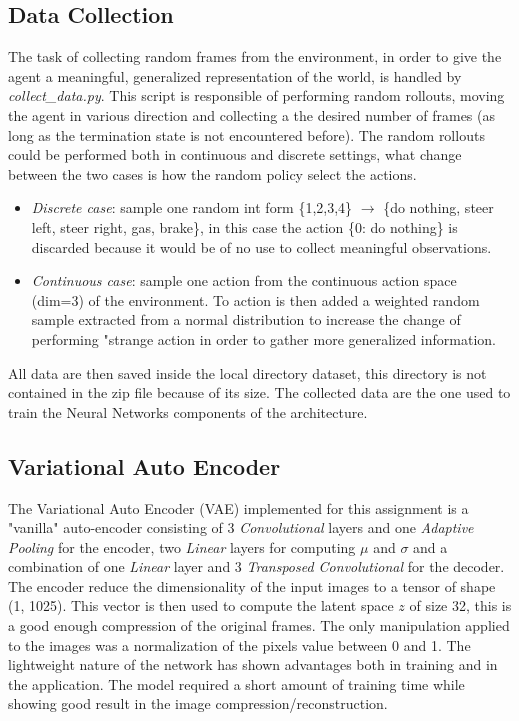 \documentclass[10pt,a4paper]{article}
\begin{document}
\subsection{Data Collection}
The task of collecting random frames from the environment, in order to give the agent a meaningful, generalized representation of the world, is handled by \textit{collect\_data.py}. This script is responsible of performing random rollouts, moving the agent in various direction and collecting a the desired number of frames (as long as the termination state is not encountered before). The random rollouts could be performed both in continuous and discrete settings, what change between the two cases is how the random policy select the actions.
\begin{itemize}
    \item \textit{Discrete case}: sample one random int form \{1,2,3,4\} $\rightarrow$ \{do nothing, steer left, steer right, gas, brake\}, in this case the action \{0: do nothing\} is discarded because it would be of no use to collect meaningful observations. 
    \item \textit{Continuous case}: sample one action from the continuous action space (dim=3) of the environment. To action is then added a weighted random sample extracted from a normal distribution to increase the change of performing "strange action in order to gather more generalized information. 
\end{itemize}
All data are then saved inside the local directory dataset, this directory is not contained in the zip file because of its size. The collected data are the one used to train the Neural Networks components of the architecture.
\newpage
\subsection{Variational Auto Encoder}
The Variational Auto Encoder (VAE) implemented for this assignment is a "vanilla" auto-encoder consisting of 3 \textit{Convolutional} layers and one \textit{Adaptive Pooling} for the encoder, two \textit{Linear} layers for computing $\mu$ and $\sigma$ and a combination of one \textit{Linear} layer and 3 \textit{Transposed Convolutional} for the decoder. The encoder reduce the dimensionality of the input images to a tensor of shape (1, 1025). This vector is then used to compute the latent space $z$ of size 32, this is a good enough compression of the original frames. The only manipulation applied to the images was a normalization of the pixels value between 0 and 1. The lightweight nature of the network has shown advantages both in training and in the application. The model required a short amount of training time while showing good result in the image compression/reconstruction. 
\end{document}
